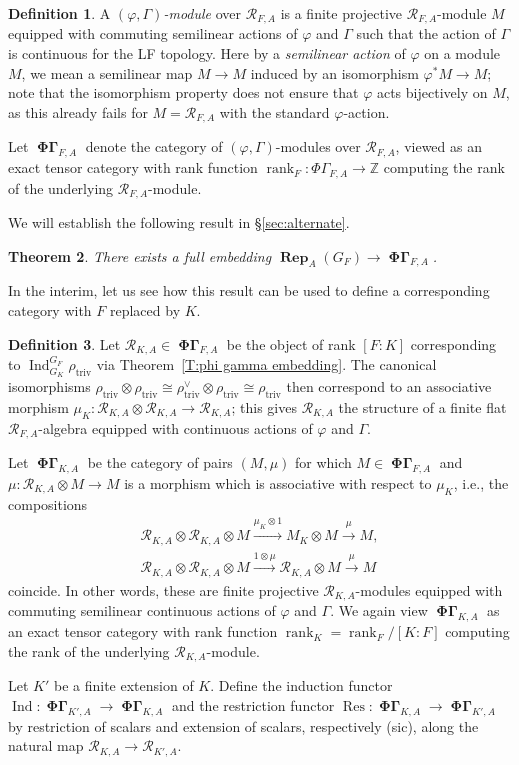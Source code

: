 \documentclass[12pt]{amsart}
\newtheorem{theorem}{Theorem}[section]
\theoremstyle{definition}
\newtheorem{defn}[theorem]{Definition}
\numberwithin{equation}{theorem}
\newcommand{\ZZ}{\mathbb{Z}}
\newcommand{\calR}{\mathcal{R}}
\newcommand{\dual}{\vee}
\DeclareMathOperator{\Ind}{Ind}
\DeclareMathOperator{\PhiGamma}{\mathbf{\Phi \Gamma}}
\DeclareMathOperator{\rank}{rank}
\DeclareMathOperator{\Rep}{\mathbf{Rep}}
\DeclareMathOperator{\Res}{Res}
\DeclareMathOperator{\triv}{triv}
\begin{document}
\begin{defn}
A \emph{$(\varphi, \Gamma)$-module} over $\calR_{F,A}$ is a finite projective $\calR_{F,A}$-module $M$ equipped with commuting semilinear actions of $\varphi$ and $\Gamma$ such that the action of $\Gamma$ is continuous for the LF topology. Here by a \emph{semilinear action} of $\varphi$ on a module $M$, we mean a semilinear map $M \to M$ induced by an isomorphism $\varphi^* M \to M$; note that the isomorphism property does not ensure that $\varphi$ acts bijectively on $M$, as this already fails for $M = \calR_{F,A}$ with the standard $\varphi$-action.

Let $\PhiGamma_{F,A}$ denote the category of $(\varphi, \Gamma)$-modules over $\calR_{F,A}$, viewed as an exact tensor category with rank function $\rank_F: \Phi\Gamma_{F,A} \to \ZZ$ computing the rank of the underlying $\calR_{F,A}$-module.
\end{defn}

We will establish the following result in \S\ref{sec:alternate}.
\begin{theorem} \label{T:phi gamma embedding1}
There exists a full embedding $\Rep_A(G_F) \to \PhiGamma_{F,A}$.
\end{theorem}
In the interim, let us see how this result can be used to define a corresponding category with $F$ replaced by $K$.

\begin{defn}
Let $\calR_{K,A} \in \PhiGamma_{F,A}$ be the object of rank $[F:K]$ corresponding to $\Ind^{G_F}_{G_K} \rho_{\triv}$ via Theorem~\ref{T:phi gamma embedding}. The canonical isomorphisms $\rho_{\triv} \otimes \rho_{\triv} \cong \rho_{\triv}^\dual \otimes \rho_{\triv} \cong \rho_{\triv}$
then correspond to an associative morphism $\mu_K: \calR_{K,A} \otimes \calR_{K,A} \to \calR_{K,A}$; this gives $\calR_{K,A}$ the structure of a finite flat $\calR_{F,A}$-algebra equipped with continuous actions of $\varphi$ and $\Gamma$.

Let $\PhiGamma_{K,A}$ be the category of pairs $(M, \mu)$ for which $M \in \PhiGamma_{F,A}$
and $\mu: \calR_{K,A} \otimes M \to M$ is a morphism which is associative with respect to $\mu_K$, i.e., the compositions
\begin{gather*}
\calR_{K,A} \otimes \calR_{K,A}  \otimes M \stackrel{\mu_K \otimes 1}{\to} M_K \otimes M \stackrel{\mu}{\to} M, \\
\calR_{K,A} \otimes \calR_{K,A} \otimes M \stackrel{1 \otimes \mu}{\to} \calR_{K,A} \otimes  M \stackrel{\mu}{\to} M
\end{gather*}
coincide. 
In other words, these are finite projective $\calR_{K,A}$-modules equipped with commuting semilinear continuous actions of $\varphi$ and $\Gamma$.
We again view $\PhiGamma_{K,A}$ as an exact tensor category with rank function $\rank_K = \rank_F / [K:F]$ computing the rank of the underlying $\calR_{K,A}$-module.

Let $K'$ be a finite extension of $K$. Define the induction functor
$\Ind: \PhiGamma_{K',A} \to \PhiGamma_{K,A}$ 
and the restriction functor $\Res: \PhiGamma_{K,A} \to \PhiGamma_{K',A}$
by restriction of scalars and extension of scalars, respectively (sic), along the natural map $\calR_{K,A}  \to \calR_{K',A}$.
\end{defn}
\end{document}
